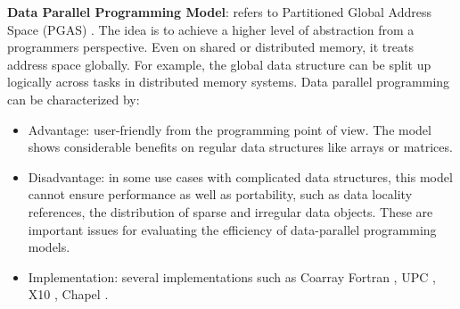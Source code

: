 \noindent \textbf{Data Parallel Programming Model}: refers to Partitioned Global Address Space (PGAS) \cite{dewael2015pgasl}. The idea is to achieve a higher level of abstraction from a programmers perspective. Even on shared or distributed memory, it treats address space globally. For example, the global data structure can be split up logically across tasks in distributed memory systems. Data parallel programming can be characterized by:
\begin{itemize}
	\item Advantage: user-friendly from the programming point of view. The model shows considerable benefits on regular data structures like arrays or matrices.
	\item Disadvantage: in some use cases with complicated data structures, this model cannot ensure performance as well as portability, such as data locality references, the distribution of sparse and irregular data objects. These are important issues for evaluating the efficiency of data-parallel programming models.
	\item Implementation: several implementations such as Coarray Fortran \cite{mellor2009new}, UPC \cite{zheng2014upc}, X10 \cite{chrles2005x10}, Chapel \cite{chamberlain2007chapel}.
\end{itemize}

